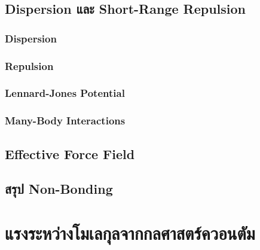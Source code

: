 \subsection{Dispersion และ Short-Range Repulsion}

\subsubsection{Dispersion}

\subsubsection{Repulsion}

\subsubsection{Lennard-Jones Potential}

\subsubsection{Many-Body Interactions}

\subsection{Effective Force Field}

\subsection{สรุป Non-Bonding}

\section{แรงระหว่างโมเลกุลจากกลศาสตร์ควอนตัม}

